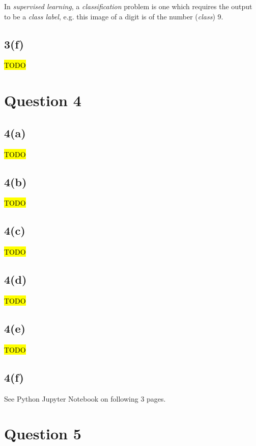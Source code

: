 \documentclass[12pt, a4paper,reqno]{article}
\begin{document}
In \emph{supervised learning}, a \emph{classification} problem is one which requires the output to be a \emph{class label}, e.g. this image of a digit is of the number (\emph{class}) 9.

\subsection*{3(f)}
\hl{TODO}


%
%
\clearpage\section*{Question 4}

\subsection*{4(a)}
\hl{TODO}

\subsection*{4(b)}
\hl{TODO}

\subsection*{4(c)}
\hl{TODO}

\subsection*{4(d)}
\hl{TODO}

\subsection*{4(e)}
\hl{TODO}

\subsection*{4(f)}
See Python Jupyter Notebook on following 3 pages.




%
%
\clearpage\section*{Question 5}
\end{document}
